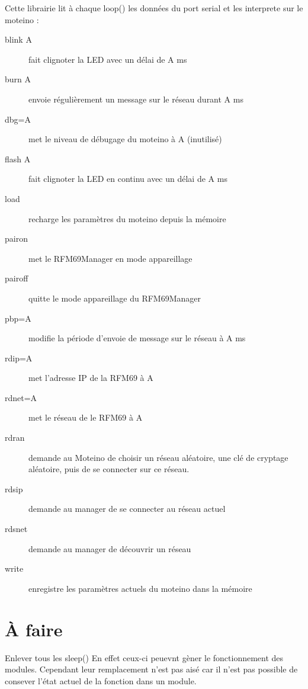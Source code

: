 \documentclass[a4paper]{report}
\begin{document}
Cette librairie lit à chaque loop() les données du port serial et les interprete sur le moteino :
\begin{description}
\item[blink A] fait clignoter la LED avec un délai de A ms
\item[burn A] envoie régulièrement un message sur le réseau durant A ms
\item[dbg=A] met le niveau de débugage du moteino à A (inutilisé)
\item[flash A] fait clignoter la LED en continu avec un délai de A ms
\item[load] recharge les paramètres du moteino depuis la mémoire
\item[pairon] met le RFM69Manager en mode appareillage
\item[pairoff] quitte le mode appareillage du RFM69Manager
\item[pbp=A] modifie la période d'envoie de message sur le réseau à A ms
\item[rdip=A] met l'adresse IP de la RFM69 à A
\item[rdnet=A] met le réseau de le RFM69 à A
\item[rdran] demande au Moteino de choisir un réseau aléatoire, une clé de cryptage aléatoire, puis de se connecter sur ce réseau.
\item[rdsip] demande au manager de se connecter au réseau actuel
\item[rdsnet] demande au manager de découvrir un réseau
\item[write] enregistre les paramètres actuels du moteino dans la mémoire
\end{description}

\section{À faire}

Enlever tous les sleep() En effet ceux-ci peuevnt gèner le fonctionnement des modules. Cependant leur remplacement n'est pas aisé car il n'est pas possible de consever l'état actuel de la fonction dans un module.
\end{document}
